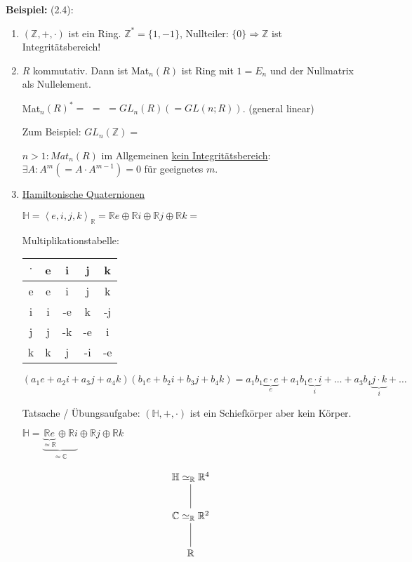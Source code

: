 \documentclass[10pt,a4paper]{article}
\begin{document}
\textbf{Beispiel:} (2.4): \begin{enumerate}
\item $(\mathbb{Z}, +, \cdot)$ ist ein Ring. $\mathbb{Z}^* = \{1,-1\}$, Nullteiler: $\{0\} \Rightarrow \mathbb{Z}$ ist Integritätsbereich!

\item $R$ kommutativ. Dann ist Mat$_n(R)$ ist Ring mit $1 = E_n$ und der Nullmatrix als Nullelement.

Mat$_n(R)^* =$  $=$  $= GL_n(R) (= GL(n;R))$. (general linear)

Zum Beispiel: $GL_n(\mathbb{Z}) =$ 

$n > 1: Mat_n(R)$ im Allgemeinen \underline{kein Integritätsbereich}: $\exists A: A^m (= A \cdot A^{m -1}) = 0$ für geeignetes $m$. 

\item \underline{Hamiltonische Quaternionen}

$\mathbb{H} = \left< e, i, j, k \right>_\mathbb{R} = \mathbb{R} e \oplus \mathbb{R} i \oplus \mathbb{R} j \oplus \mathbb{R} k = $ 

Multiplikationstabelle:
\begin{tabular}{ c | c c c c}
$\cdot$ & e & i & j & k \\
\hline
e & e & i & j & k\\
i & i & -e & k & -j\\
j & j & -k & -e & i\\
k & k & j & -i & -e\\
\end{tabular}

$(a_1 e + a_2 i + a_3 j + a_4 k) (b_1 e + b_2 i + b_3 j + b_4 k) = a_1 b_1 \underbrace{e \cdot e}_{e} + a_1 b_1 \underbrace{e \cdot i}_{i} + \dots + a_3 b_4 \underbrace{j \cdot k}_{i} + \dots$

Tatsache / Übungsaufgabe: $(\mathbb{H}, +, \cdot)$ ist ein Schiefkörper aber kein Körper.

$\mathbb{H} = \underbrace{\underbrace{\mathbb{R} e}_{\simeq \mathbb{R}} \oplus \mathbb{R} i}_{\simeq \mathbb{C}} \oplus \mathbb{R} j \oplus \mathbb{R} k$

\begin{displaymath}
    \xymatrix
    {
      \mathbb{H} \ar@{-}[d] \simeq_\mathbb{R} \mathbb{R}^4\\
      \mathbb{C} \ar@{-}[d] \simeq_\mathbb{R} \mathbb{R}^2\\
      \mathbb{R}
    }
\end{displaymath} 


\end{enumerate}
\end{document}

